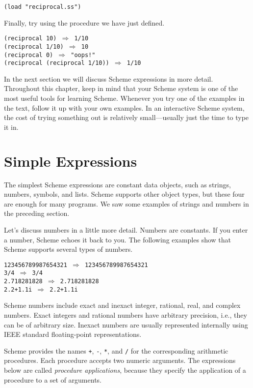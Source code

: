 \texttt{(load "reciprocal.ss")}

Finally, try using the procedure we have just defined.


\begin{alltt}
(reciprocal 10) \(\Rightarrow\) 1/10
(reciprocal 1/10) \(\Rightarrow\) 10
(reciprocal 0) \(\Rightarrow\) "oops!"
(reciprocal (reciprocal 1/10)) \(\Rightarrow\) 1/10
\end{alltt}


In the next section we will discuss Scheme expressions in more detail.
Throughout this chapter, keep in mind that your Scheme system is one
of the most useful tools for learning Scheme.
Whenever you try one of the examples in the text, follow it up with
your own examples.
In an interactive Scheme system, the cost of trying something out
is relatively small---usually just the time to type it in.



\section{\label{start_g6}\label{start_h2}Simple Expressions\label{start_SECTGSSIMPLE}}



The simplest Scheme expressions are constant data objects, such as strings,
numbers, symbols, and lists.
Scheme supports other object types, but these four are enough for
many programs.
We saw some examples of strings and numbers in the preceding
section.


Let's discuss \label{start_s5}numbers in a little more detail.
Numbers are constants.
If you enter a number, Scheme echoes it back to you.
The following examples show that Scheme supports several types of
numbers.


\begin{alltt}
123456789987654321 \(\Rightarrow\) 123456789987654321
3/4 \(\Rightarrow\) 3/4
2.718281828 \(\Rightarrow\) 2.718281828
2.2+1.1i \(\Rightarrow\) 2.2+1.1i
\end{alltt}


Scheme numbers include exact and inexact integer, rational, real, and
complex numbers.
Exact integers and rational numbers have arbitrary precision, i.e., they
can be of arbitrary size.
Inexact numbers are usually represented internally using
IEEE standard floating-point representations.


Scheme provides the names \label{start_s6}\texttt{+}, \label{start_s7}\texttt{-}, \label{start_s8}\texttt{*}, and \label{start_s9}\texttt{/} for
the corresponding arithmetic procedures.
Each procedure accepts two numeric arguments.
The expressions below are called
\label{start_s10}\textit{procedure applications},
because they specify the application of a procedure to
a set of arguments.


